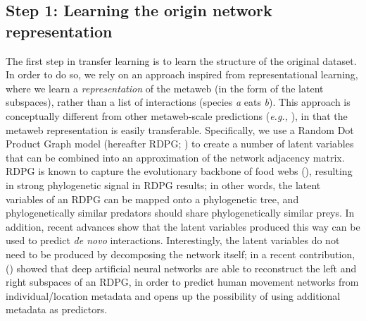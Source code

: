 \begin{refsection}
\subsection{Step 1: Learning the origin network
representation}\label{step-1-learning-the-origin-network-representation}

The first step in transfer learning is to learn the structure of the
original dataset. In order to do so, we rely on an approach inspired
from representational learning, where we learn a \emph{representation}
of the metaweb (in the form of the latent subspaces), rather than a list
of interactions (species \emph{a} eats \emph{b}). This approach is
conceptually different from other metaweb-scale predictions (\emph{e.g.,}
\cite{Albouy2019Marine}), in that the metaweb representation is easily
transferable. Specifically, we use a Random Dot Product Graph model
(hereafter RDPG; \cite{Young2007Random}) to create a number of latent
variables that can be combined into an approximation of the network
adjacency matrix. RDPG is known to capture the evolutionary backbone of
food webs (\cite{DallaRiva2016Exploring}), resulting in strong phylogenetic
signal in RDPG results; in other words, the latent variables of an RDPG
can be mapped onto a phylogenetic tree, and phylogenetically similar
predators should share phylogenetically similar preys. In addition,
recent advances show that the latent variables produced this way can be
used to predict \emph{de novo} interactions. Interestingly, the latent
variables do not need to be produced by decomposing the network itself;
in a recent contribution, (\cite{Runghen2021Exploiting}) showed that deep artificial
neural networks are able to reconstruct the left and right subspaces of
an RDPG, in order to predict human movement networks from
individual/location metadata and opens up the possibility of using
additional metadata as predictors.


\end{refsection}
